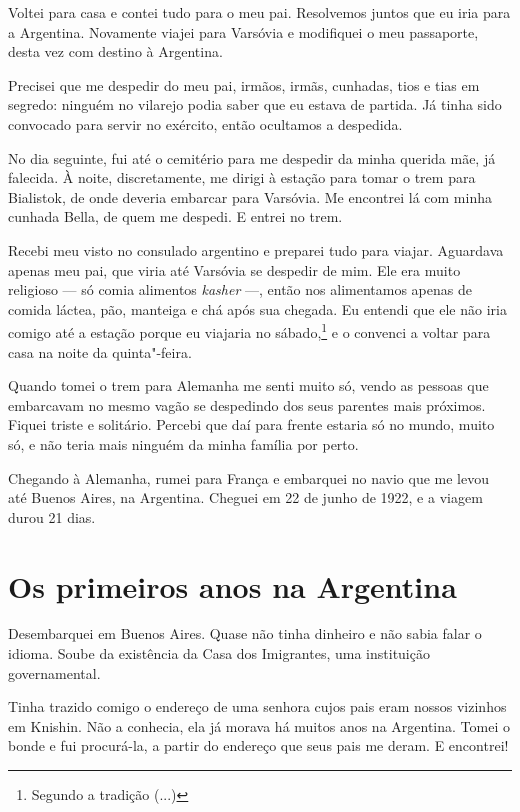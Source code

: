Voltei para casa e contei tudo para o meu pai. Resolvemos juntos que eu
iria para a Argentina. Novamente viajei para Varsóvia e
modifiquei o meu passaporte, desta vez com destino à Argentina.

Precisei que me despedir do meu pai, irmãos, irmãs, cunhadas, tios e tias em
segredo: ninguém no vilarejo podia saber que eu estava de partida. Já tinha 
sido convocado para servir no exército, então ocultamos a despedida.

No dia seguinte, fui até o cemitério para me despedir da minha querida
mãe, já falecida. À noite, discretamente, me dirigi à estação para
tomar o trem para Bialistok, de onde deveria embarcar para Varsóvia. Me encontrei lá 
com minha cunhada Bella, de quem me despedi. E entrei no trem.

Recebi meu visto no consulado argentino e preparei tudo para
viajar. Aguardava apenas meu pai, que viria até Varsóvia se despedir de mim.
Ele era muito religioso --- só comia alimentos \textit{kasher} ---, então nos
alimentamos apenas de comida láctea, pão,
manteiga e chá após sua chegada. Eu entendi que ele não iria comigo até a estação porque
eu viajaria no sábado,\footnote{Segundo a tradição (...)} e o convenci a voltar para casa na
noite da quinta"-feira. 

Quando tomei o trem para Alemanha me senti muito só, vendo as pessoas que embarcavam no mesmo vagão se despedindo
dos seus parentes mais próximos. Fiquei triste e solitário. Percebi que daí para frente estaria
só no mundo, muito só, e não teria mais ninguém da minha família por perto.

Chegando à Alemanha, rumei para França e embarquei no navio que me
levou até Buenos Aires, na Argentina. Cheguei em 22 de junho de 1922, e a viagem durou 21 dias.

\chapter{Os primeiros anos na Argentina}

Desembarquei em Buenos Aires. Quase não tinha dinheiro e não sabia falar
o idioma. Soube da existência da Casa dos Imigrantes, uma instituição governamental.

Tinha trazido comigo o endereço de uma senhora cujos pais eram nossos
vizinhos em Knishin. Não a conhecia, ela já morava há muitos anos
na Argentina. Tomei o bonde e fui procurá-la, a partir do endereço que seus pais me deram. E encontrei!

